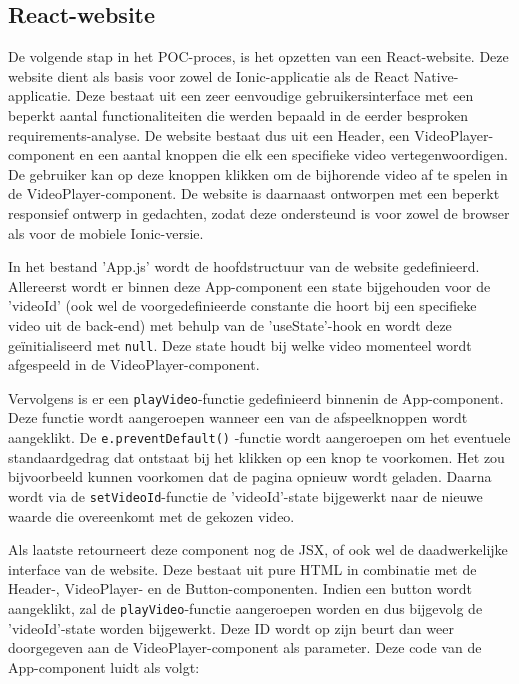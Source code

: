\subsection{React-website}
\label{subsec:react-website}

De volgende stap in het POC-proces, is het opzetten van een React-website. Deze website dient als basis voor zowel de Ionic-applicatie als de React Native-applicatie. Deze bestaat uit een zeer eenvoudige gebruikersinterface met een beperkt aantal functionaliteiten die werden bepaald in de eerder besproken requirements-analyse. De website bestaat dus uit een Header, een VideoPlayer-component en een aantal knoppen die elk een specifieke video vertegenwoordigen. De gebruiker kan op deze knoppen klikken om de bijhorende video af te spelen in de VideoPlayer-component. De website is daarnaast ontworpen met een beperkt responsief ontwerp in gedachten, zodat deze ondersteund is voor zowel de browser als voor de mobiele Ionic-versie.

In het bestand 'App.js' wordt de hoofdstructuur van de website gedefinieerd. Allereerst wordt er binnen deze App-component een state bijgehouden voor de 'videoId' (ook wel de voorgedefinieerde constante die hoort bij een specifieke video uit de back-end) met behulp van de 'useState'-hook en wordt deze geïnitialiseerd met \verb|null|. Deze state houdt bij welke video momenteel wordt afgespeeld in de VideoPlayer-component.

Vervolgens is er een \verb|playVideo|-functie gedefinieerd binnenin de App-component. Deze functie wordt aangeroepen wanneer een van de afspeelknoppen wordt aangeklikt. De \verb|e.preventDefault()| -functie wordt aangeroepen om het eventuele standaardgedrag dat ontstaat bij het klikken op een knop te voorkomen. Het zou bijvoorbeeld kunnen voorkomen dat de pagina opnieuw wordt geladen. Daarna wordt via de \verb|setVideoId|-functie de 'videoId'-state bijgewerkt naar de nieuwe waarde die overeenkomt met de gekozen video.

Als laatste retourneert deze component nog de JSX, of ook wel de daadwerkelijke interface van de website. Deze bestaat uit pure HTML in combinatie met de Header-, VideoPlayer- en de Button-componenten. Indien een button wordt aangeklikt, zal de \verb|playVideo|-functie aangeroepen worden en dus bijgevolg de 'videoId'-state worden bijgewerkt. Deze ID wordt op zijn beurt dan weer doorgegeven aan de VideoPlayer-component als parameter. Deze code van de App-component luidt als volgt:


